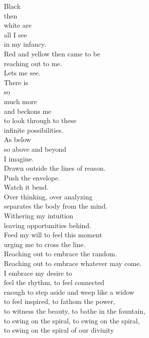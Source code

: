 \newpage
\begin{flushright}
\footnotesize{\noindent 
Black \\
then \\
white are \\
all I see \\
in my infancy. \\
Red and yellow then came to be \\
reaching out to me. \\
Lets me see. \\
\vspace{0.2 cm}
There is \\
so \\
much more \\
and beckons me \\
to look through to these \\
infinite possibilities. \\
As below \\
so above and beyond \\
I imagine. \\
Drawn outside the lines of reason. \\
Push the envelope. \\
Watch it bend. \\
\vspace{0.2 cm}
Over thinking, over analyzing \\
separates the body from the mind. \\
Withering my intuition \\
leaving opportunities behind. \\
\vspace{0.2 cm}
Feed my will to feel this moment \\
urging me to cross the line. \\
Reaching out to embrace the random. \\
Reaching out to embrace whatever may come. \\
\vspace{0.2 cm}
I embrace my desire to \\
feel the rhythm, to feel connected \\
enough to step aside and weep like a widow \\
to feel inspired, to fathom the power, \\
to witness the beauty, to bathe in the fountain, \\
to swing on the spiral, to swing on the spiral, \\
to swing on the spiral of our divinity \\
}
\end{flushright}
